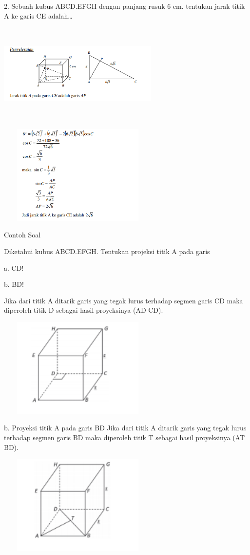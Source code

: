 \documentclass[11pt,fleqn]{book} %
\begin{document}
2. Sebuah kubus ABCD.EFGH dengan panjang rusuk 6 cm. tentukan jarak titik A ke
garis CE adalah…

\includegraphics[width = 8cm, height= 5cm]{Pictures/gi4.png}

\includegraphics[width = 8cm, height= 5cm]{Pictures/gi5.png}

Contoh Soal

Diketahui kubus ABCD.EFGH. Tentukan projeksi titik
A pada garis

a. CD!

b. BD!

Jika dari titik A ditarik garis yang tegak lurus terhadap
segmen garis CD maka diperoleh titik D sebagai hasil
proyeksinya (AD CD). 

\includegraphics[width = 8cm, height= 5cm]{Pictures/gi6.png}

b. Proyeksi titik A pada garis BD
Jika dari titik A ditarik garis yang tegak lurus
terhadap segmen garis BD maka diperoleh titik T
sebagai hasil proyeksinya (AT  BD).

\includegraphics[width = 8cm, height= 5cm]{Pictures/gi7.png}
\end{document}
